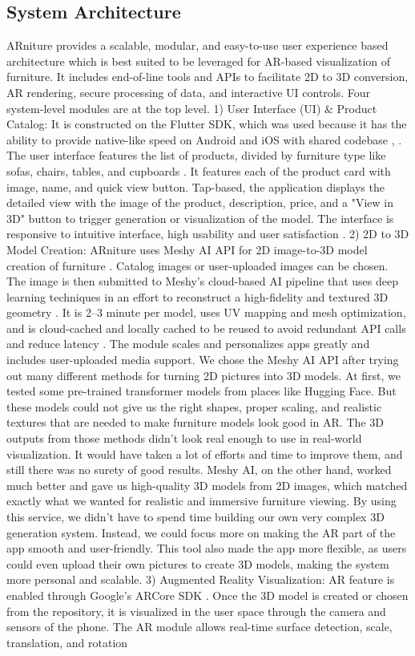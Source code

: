 \documentclass[conference]{IEEEtran}
\begin{document}
\subsection{System Architecture}
ARniture provides a scalable, modular, and easy-to-use user experience based architecture which is best suited to be leveraged for AR-based visualization of furniture. It includes end-of-line tools and APIs to facilitate 2D to 3D conversion, AR rendering, secure processing of data, and interactive UI controls. Four system-level modules are at the top level. 1) User Interface (UI) \& Product Catalog: It is constructed on the Flutter SDK, which was used because it has the ability to provide native-like speed on Android and iOS with shared codebase \cite{ref3}, \cite{ref9}. The user interface features the list of products, divided by furniture type like sofas, chairs, tables, and cupboards \cite{ref6}. It features each of the product card with image, name, and quick view button. Tap-based, the application displays the detailed view with the image of the product, description, price, and a "View in 3D" button to trigger generation or visualization of the model. The interface is responsive to intuitive interface, high usability and user satisfaction \cite{ref8}. 2) 2D to 3D Model Creation: ARniture uses Meshy AI API for 2D image-to-3D model creation of furniture \cite{ref5}. Catalog images or user-uploaded images can be chosen. The image is then submitted to Meshy's cloud-based AI pipeline that uses deep learning techniques in an effort to reconstruct a high-fidelity and textured 3D geometry \cite{ref12}. It is 2--3 minute per model, uses UV mapping and mesh optimization, and is cloud-cached and locally cached to be reused to avoid redundant API calls and reduce latency \cite{ref20}. The module scales and personalizes apps greatly and includes user-uploaded media support. We chose the Meshy AI API after trying out many different methods for turning 2D pictures into 3D models. At first, we tested some pre-trained transformer models from places like Hugging Face. But these models could not give us the right shapes, proper scaling, and realistic textures that are needed to make furniture models look good in AR. The 3D outputs from those methods didn't look real enough to use in real-world visualization. It would have taken a lot of efforts and time to improve them, and still there was no surety of good results. Meshy AI, on the other hand, worked much better and gave us high-quality 3D models from 2D images, which matched exactly what we wanted for realistic and immersive furniture viewing. By using this service, we didn't have to spend time building our own very complex 3D generation system. Instead, we could focus more on making the AR part of the app smooth and user-friendly. This tool also made the app more flexible, as users could even upload their own pictures to create 3D models, making the system more personal and scalable. 3) Augmented Reality Visualization: AR feature is enabled through Google's ARCore SDK \cite{ref2}. Once the 3D model is created or chosen from the repository, it is visualized in the user space through the camera and sensors of the phone. The AR module allows real-time surface detection, scale, translation, and rotation 
\end{document}
